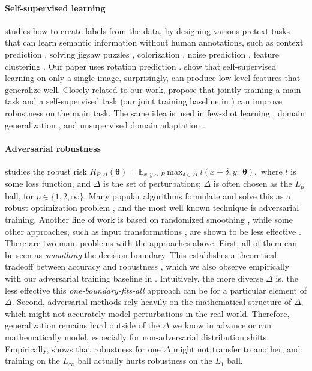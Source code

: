 \documentclass{article}
\theoremstyle{plain}
\theoremstyle{remark}
\theoremstyle{definition}
\def\vtheta{{\bm{\theta}}}
\newcommand{\E}{\mathbb{E}}
\begin{document}
\paragraph{Self-supervised learning} studies how to create labels from the data, by designing various pretext tasks that can learn semantic information without human annotations, 
such as context prediction \citep{doersch2015unsupervised}, solving jigsaw puzzles \citep{noroozi2016unsupervised}, colorization \citep{larsson2017colorproxy,zhang2016colorful}, noise prediction \citep{bojanowski2017unsupervised}, feature clustering \citep{caron2018deep}. 
Our paper uses rotation prediction \citep{gidaris2018unsupervised}.
\citet{asano2019surprising} show that self-supervised learning on only a single image, surprisingly, can produce low-level features that generalize well.
Closely related to our work, \citet{hendrycks2019using} propose that jointly training a main task and a self-supervised task (our joint training baseline in ) can improve robustness on the main task.
The same idea is used in few-shot learning  \citep{su2019boosting}, domain generalization \citep{carlucci2019domain}, and unsupervised domain adaptation \citep{sun2019uda}.

\paragraph{Adversarial robustness}
studies the robust risk
$
R_{P, \Delta}(\vtheta) = \E_{x,y\sim P} \max_{\delta \in \Delta}  l(x+\delta, y; ~\vtheta),
$
where $l$ is some loss function, and $\Delta$ is the set of perturbations; $\Delta$ is often chosen as the $L_p$ ball, for $p\in \{1, 2, \infty\}$.
Many popular algorithms formulate and solve this as a robust optimization problem \citep{goodfellow2014explaining, madry2017towards, sinha2017certifying, raghunathan2018certified, wong2017provable, croce2018provable}, and the most well known technique is adversarial training.
Another line of work is based on randomized smoothing \citep{cohen2019certified, salman2019provably}, while some other approaches, such as input transformations
\citep{guo2017countering, song2017pixeldefend}, are shown to be less effective \citep{athalye2018obfuscated}.
There are two main problems with the approaches above.
First, all of them can be seen as \emph{smoothing} the decision boundary.
This establishes a theoretical tradeoff between accuracy and robustness \citep{tsipras2018robustness, zhang2019theoretically}, which we also observe empirically with our adversarial training baseline in .
Intuitively, the more diverse $\Delta$ is, the less effective this \emph{one-boundary-fits-all} approach can be for a particular element of $\Delta$.
Second, adversarial methods rely heavily on the mathematical structure of $\Delta$, which might not accurately model perturbations in the real world. 
Therefore, generalization remains hard outside of the $\Delta$ we know in advance or can mathematically model, especially for non-adversarial distribution shifts.
Empirically, \citet{kang2019transfer} shows that robustness for one $\Delta$ might not transfer to another, and training on the $L_\infty$ ball actually hurts robustness on the $L_1$ ball.
\end{document}
